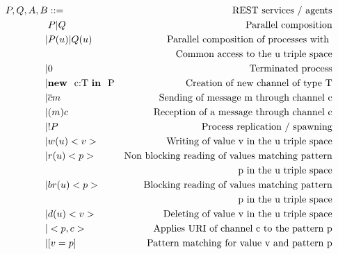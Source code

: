 \begin{eqnarray*}
  P,Q,A,B  & ::=  & \mbox{REST services / agents} \\
       & P | Q   & \mbox{Parallel composition} \\
    |     & P(u) | Q(u)   & \mbox{Parallel composition of processes with } \\
       &   & \mbox{Common access to the u triple space} \\
    |     & 0  & \mbox{Terminated process} \\
    |     & \mbox{{\bf new } c:T {\bf in } P} & \mbox{Creation of new channel of type T} \\
    |     & \overline{c}m  & \mbox{Sending of message m through channel c} \\
    |     & (m)c  & \mbox{Reception of a message through channel c} \\
    |  & !P  & \mbox{Process replication / spawning} \\
    |  & w(u)<v>  & \mbox{Writing of value v in the u triple space} \\
    |  & r(u)<p>  & \mbox{Non blocking reading of values matching pattern} \\
       &       & \mbox{p in the u triple space} \\
    |  & br(u)<p> & \mbox{Blocking reading of values matching pattern} \\
       &       & \mbox{p in the u triple space} \\
    |  & d(u)<v>  & \mbox{Deleting of value v in the u triple space} \\
    |  & <p,c>  & \mbox{Applies URI of channel c to the pattern p} \\
    |  & [v = p]  & \mbox{Pattern matching for value v and pattern p} \\
\end{eqnarray*}
